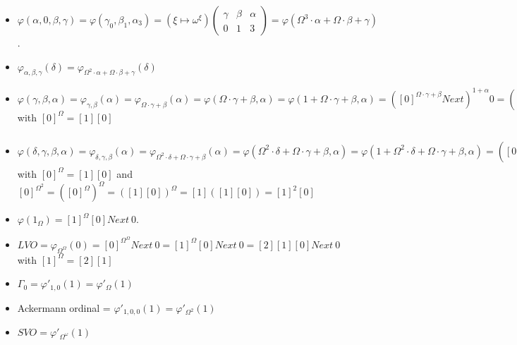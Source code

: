 \documentclass[10pt]{article}
\begin{document}
\begin{itemize}
     \setlength{\itemsep}{1pt}
     \setlength{\parskip}{0pt}
     \setlength{\parsep}{0pt}

\item \( \varphi(\alpha,0,\beta,\gamma) = \varphi(\gamma_0,\beta_1,\alpha_3) = (\xi \mapsto \omega^\xi) \begin{pmatrix} \gamma & \beta & \alpha \\ 0 & 1 & 3 \end{pmatrix} = \varphi(\Omega^3 \cdot \alpha + \Omega \cdot \beta + \gamma) \). 

\item \( \varphi_{\alpha,\beta,\gamma}(\delta) = \varphi_{\Omega^2 \cdot \alpha + \Omega \cdot \beta + \gamma}(\delta) \)

\item \( \varphi(\gamma,\beta,\alpha) = \varphi_{\gamma,\beta}(\alpha) = \varphi_{\Omega \cdot \gamma + \beta}(\alpha) = \varphi(\Omega \cdot \gamma + \beta, \alpha) = \varphi(1 + \Omega \cdot \gamma + \beta, \alpha) = ([0]^{\Omega \cdot \gamma + \beta} Next)^{1+\alpha} 0 = ([0]^\beta (([0]^\Omega)^\gamma Next))^{1+\alpha} 0 = ([0]^\beta (([1] [0])^\gamma Next))^{1+\alpha} 0 \) with \( [0]^\Omega = [1] [0] \)

\item \( \varphi(\delta,\gamma,\beta,\alpha) = \varphi_{\delta,\gamma,\beta}(\alpha) = \varphi_{\Omega^2 \cdot \delta + \Omega \cdot \gamma + \beta}(\alpha) = \varphi(\Omega^2 \cdot \delta + \Omega \cdot \gamma + \beta, \alpha) = \varphi(1 + \Omega^2 \cdot \delta + \Omega \cdot \gamma + \beta, \alpha) = ([0]^{\Omega^2 \cdot \delta + \Omega \cdot \gamma + \beta} Next)^{1+\alpha} 0 = ([0]^\beta (([0]^\Omega)^\gamma (([0]^{\Omega^2})^\delta Next)))^{1+\alpha} 0 = ([0]^\beta (([1] [0])^\gamma (([1]^2 [0])^\delta Next)))^{1+\alpha} 0 \) with \( [0]^\Omega = [1] [0] \) and \( [0]^{\Omega^2} = ([0]^\Omega)^\Omega = ([1] [0])^\Omega = [1] ([1] [0]) = [1]^2 [0] \)

\item \( \varphi(1_\Omega) = [1]^\Omega [0] Next\ 0 \). 

\item \( LVO = \varphi_{\Omega^\Omega}(0) = [0]^{\Omega^\Omega} Next\ 0 = [1]^\Omega [0] Next\ 0 = [2] [1] [0] Next\ 0 \) with \( [1]^\Omega = [2] [1] \)

\item \( \Gamma_0 = \varphi'_{1,0}(1) = \varphi'_\Omega(1) \)
\item Ackermann ordinal = \( \varphi'_{1,0,0}(1) = \varphi'_{\Omega^2}(1) \)
\item \( SVO = \varphi'_{\Omega^\omega}(1) \)


\end{itemize}
\end{document}
